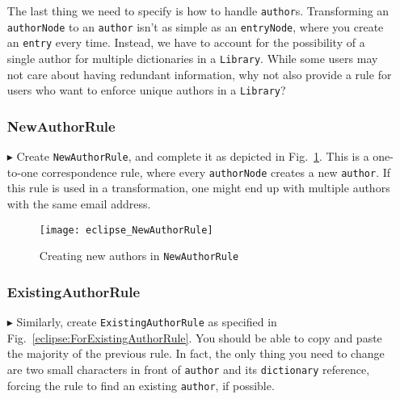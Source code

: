 \begin{itemize}
\vspace{0.5cm}

The last thing we need to specify is how to handle \texttt{author}s. Transforming an \texttt{authorNode} to an \texttt{author} isn't as simple as
an \texttt{entryNode}, where you create an \texttt{entry} every time. Instead, we have to account for the possibility of a single author
for multiple dictionaries in a \texttt{Library}. While some users may not care about having redundant information, why not also provide a rule for users
who want to enforce unique authors in a \texttt{Library}?

\subsubsection{NewAuthorRule} %

\item[$\blacktriangleright$] Create \texttt{NewAuthorRule}, and complete it as depicted in Fig.~\ref{eclipse:ForAllNewAuthorRule}. This is a one-to-one
correspondence rule, where every \texttt{authorNode} creates a new \texttt{author}. If this rule is used in a transformation, one might end up with
multiple authors with the same email address.

\vspace{0.5cm}

\begin{figure}[htbp]
\begin{center}
  \texttt{[image: eclipse\_NewAuthorRule]}
  \caption{Creating new authors in \texttt{NewAuthorRule}}
  \label{eclipse:ForAllNewAuthorRule}
\end{center}
\end{figure}

\newpage

\subsubsection{ExistingAuthorRule} %

\item[$\blacktriangleright$] Similarly, create \texttt{ExistingAuthorRule} as specified in Fig.~\ref{eclipse:ForExistingAuthorRule}. You should be able to
copy and paste the majority of the previous rule. In fact, the only thing you need to change are two small characters in front of \texttt{author} and its
\texttt{dictionary} reference, forcing the rule to find an existing \texttt{author}, if possible.


\end{itemize}
